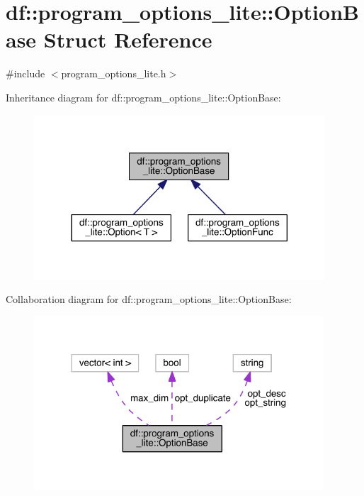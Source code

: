 \hypertarget{structdf_1_1program__options__lite_1_1_option_base}{}\section{df\+:\+:program\+\_\+options\+\_\+lite\+:\+:Option\+Base Struct Reference}
\label{structdf_1_1program__options__lite_1_1_option_base}


{\ttfamily \#include $<$program\+\_\+options\+\_\+lite.\+h$>$}



Inheritance diagram for df\+:\+:program\+\_\+options\+\_\+lite\+:\+:Option\+Base\+:
\nopagebreak
\begin{figure}[H]
\begin{center}
\leavevmode
\includegraphics[width=308pt]{df/dad/structdf_1_1program__options__lite_1_1_option_base__inherit__graph}
\end{center}
\end{figure}


Collaboration diagram for df\+:\+:program\+\_\+options\+\_\+lite\+:\+:Option\+Base\+:
\nopagebreak
\begin{figure}[H]
\begin{center}
\leavevmode
\includegraphics[width=307pt]{d5/d86/structdf_1_1program__options__lite_1_1_option_base__coll__graph}
\end{center}
\end{figure}

